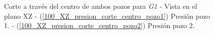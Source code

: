 \documentclass[10pt,a4paper,final]{article}
\begin{document}
\begin{figure}[tbhp]
   \centering
   \hspace{0.1\linewidth}
    \caption{Corte a través del centro de ambos pozos para \emph{G1} - Vista en el plano XZ - (\ref{100_XZ_presion_corte_centro_pozo1}) Presión pozo 1. - (\ref{100_XZ_presion_corte_centro_pozo2})  Presión pozo 2.}
   \label{100_XZ_presion_corte_centro}                %
\end{figure}
\end{document}
